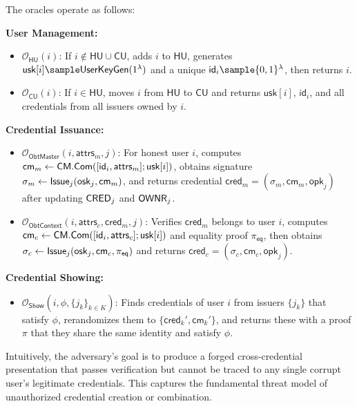 \noindent The oracles operate as follows:

\noindent \textbf{User Management:}
\begin{itemize}
    \item $\mathcal{O}_{\mathsf{HU}}(i)$: If $i \notin \mathsf{HU} \cup \mathsf{CU}$, adds $i$ to $\mathsf{HU}$, generates $\mathsf{usk}[i] \sample \UserKeyGen(1^\lambda)$ and a unique $\mathsf{id}_i \sample \{0,1\}^\lambda$, then returns $i$.
    
    \item $\mathcal{O}_{\mathsf{CU}}(i)$: If $i \in \mathsf{HU}$, moves $i$ from $\mathsf{HU}$ to $\mathsf{CU}$ and returns $\mathsf{usk}[i]$, $\mathsf{id}_i$, and all credentials from all issuers owned by $i$.
\end{itemize}

\noindent \textbf{Credential Issuance:}
\begin{itemize}
    \item $\mathcal{O}_{\mathsf{ObtMaster}}(i, \mathsf{attrs}_m, j)$: For honest user $i$, computes $\mathsf{cm}_m \gets \mathsf{CM.Com}([\mathsf{id}_i, \mathsf{attrs}_m]; \mathsf{usk}[i])$, obtains signature $\sigma_m \gets \mathsf{Issue}_j(\mathsf{osk}_j, \mathsf{cm}_m)$, and returns credential $\mathsf{cred}_m = (\sigma_m, \mathsf{cm}_m, \mathsf{opk}_j)$ after updating $\mathsf{CRED}_j$ and $\mathsf{OWNR}_j$.
    
    \item $\mathcal{O}_{\mathsf{ObtContext}}(i, \mathsf{attrs}_c, \mathsf{cred}_m, j)$: Verifies $\mathsf{cred}_m$ belongs to user $i$, computes $\mathsf{cm}_c \gets \mathsf{CM.Com}([\mathsf{id}_i, \mathsf{attrs}_c]; \mathsf{usk}[i])$ and equality proof $\pi_{\mathsf{eq}}$, then obtains $\sigma_c \gets \mathsf{Issue}_j(\mathsf{osk}_j, \mathsf{cm}_c, \pi_{\mathsf{eq}})$ and returns $\mathsf{cred}_c = (\sigma_c, \mathsf{cm}_c, \mathsf{opk}_j)$.
\end{itemize}

\noindent \textbf{Credential Showing:}
\begin{itemize}
    \item $\mathcal{O}_{\mathsf{Show}}(i, \phi, \{j_k\}_{k \in K})$: Finds credentials of user $i$ from issuers $\{j_k\}$ that satisfy $\phi$, rerandomizes them to $\{\mathsf{cred}_k', \mathsf{cm}_k'\}$, and returns these with a proof $\pi$ that they share the same identity and satisfy $\phi$.
\end{itemize}

\noindent Intuitively, the adversary's goal is to produce a forged cross-credential presentation that passes verification but cannot be traced to any single corrupt user's legitimate credentials. This captures the fundamental threat model of unauthorized credential creation or combination.



